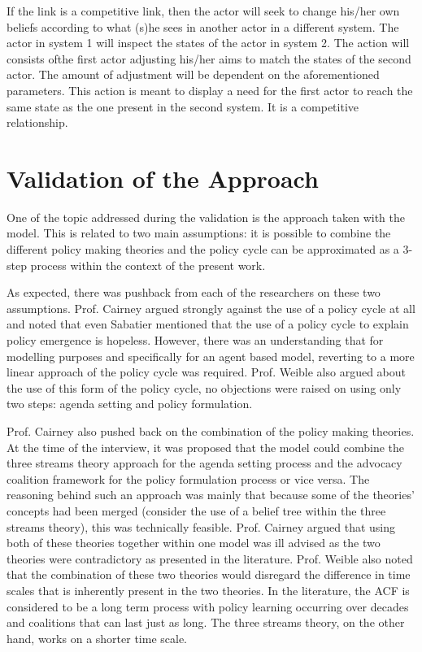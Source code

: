 If the link is a competitive link, then the actor will seek to change his/her own beliefs according to what (s)he sees in another actor in a different system. The actor in system 1 will inspect the states of the actor in system 2. The action will consists ofthe first actor adjusting his/her aims to match the states of the second actor. The amount of adjustment will be dependent on the aforementioned parameters. This action is meant to display a need for the first actor to reach the same state as the one present in the second system. It is a competitive relationship.

%
\section{Validation of the Approach}
\label{sec:validationApproach}
 
One of the topic addressed during the validation is the approach taken with the model. This is related to two main assumptions: it is possible to combine the different policy making theories and the policy cycle can be approximated as a 3-step process within the context of the present work.
 
As expected, there was pushback from each of the researchers on these two assumptions. Prof. Cairney argued strongly against the use of a policy cycle at all and noted that even Sabatier mentioned that the use of a policy cycle to explain policy emergence is hopeless. However, there was an understanding that for modelling purposes and specifically for an agent based model, reverting to a more linear approach of the policy cycle was required. Prof. Weible also argued about the use of this form of the policy cycle, no objections were raised on using only two steps: agenda setting and policy formulation.
 
Prof. Cairney also pushed back on the combination of the policy making theories. At the time of the interview, it was proposed that the model could combine the three streams theory approach for the agenda setting process and the advocacy coalition framework for the policy formulation process or vice versa. The reasoning behind such an approach was mainly that because some of the theories' concepts had been merged (consider the use of a belief tree within the three streams theory), this was technically feasible. Prof. Cairney argued that using both of these theories together within one model was ill advised as the two theories were contradictory as presented in the literature. Prof. Weible also noted that the combination of these two theories would disregard the difference in time scales that is inherently present in the two theories. In the literature, the ACF is considered to be a long term process with policy learning occurring over decades and coalitions that can last just as long. The three streams theory, on the other hand, works on a shorter time scale.
 
